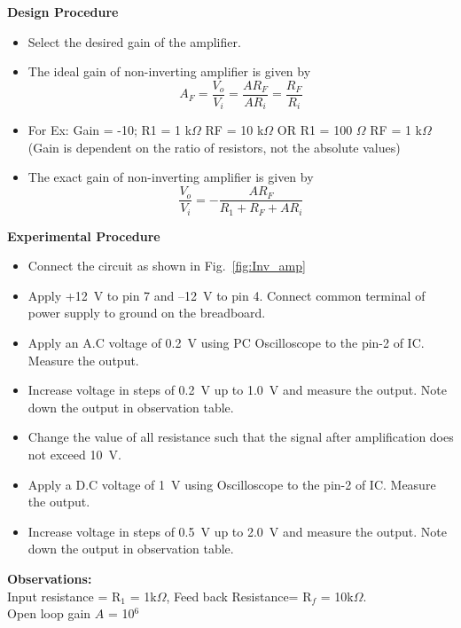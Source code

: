 \documentclass[11pt]{scrreprt}
\begin{document}
\noindent\textbf{Design Procedure}
\begin{itemize}
\item Select the desired gain of the amplifier.
\item The ideal gain of non-inverting amplifier is given by
\begin{equation}\label{Ideal gain inverting}
A_F = \frac{V_o}{V_i} = \frac{A R_F}{A R_i} = \frac{R_F}{R_i}
\end{equation}

\item For Ex: Gain = -10; R1 = 1 k$\Omega$ RF = 10 k$\Omega$ OR R1 = 100 $\Omega$ RF = 1 k$\Omega$ (Gain is dependent on the ratio of resistors, not the absolute values)
\item The exact gain of non-inverting amplifier is given by
\begin{equation}\label{Exact gain inverting}
\frac{V_o}{V_i} = - \frac{A R_F}{R_1 + R_F + A R_i}
\end{equation}
\end{itemize}

\noindent\textbf{Experimental Procedure}
\begin{itemize}
\item Connect the circuit as shown in Fig.~\ref{fig:Inv_amp}
\item Apply +12~V to pin 7 and –12~V to pin 4. Connect common terminal of power supply to ground on the breadboard.
\item Apply an A.C voltage of 0.2~V using PC Oscilloscope to the pin-2 of IC. Measure the output.
\item Increase voltage in steps of 0.2~V up to 1.0~V and measure the output. Note down the output in observation table.
\item Change the value of all resistance such that the signal after amplification does not exceed 10~V.
\item Apply a D.C voltage of 1~V using Oscilloscope to the pin-2 of IC. Measure the output.
\item Increase voltage in steps of 0.5~V up to 2.0~V and measure the output. Note down the output in observation table.
\end{itemize}

\noindent\textbf{Observations:}\\
Input resistance = R$_1$ = 1k$\Omega$, Feed back Resistance= R$_f$ = 10k$\Omega$.\\
Open loop gain $A$ = 10$^6$
\end{document}
